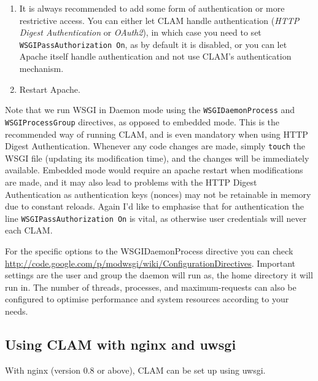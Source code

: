 \documentclass[a4paper,12pt,twoside,openright]{report}
\begin{document}
\begin{enumerate}[leftmargin=5mm]
\item It is always recommended to add some form of authentication or more restrictive
access. You can either let CLAM handle authentication (\emph{HTTP Digest
Authentication} or \emph{OAuth2}), in which case you need to set \texttt{WSGIPassAuthorization
On}, as by default it is disabled, or you can let Apache itself handle
authentication and not use CLAM's authentication mechanism.  
\item Restart Apache. 
\end{enumerate}

Note that we run WSGI in Daemon mode using the \texttt{WSGIDaemonProcess} and
\texttt{WSGIProcessGroup} directives, as opposed to embedded mode. This is the
recommended way of running CLAM, and is even mandatory when using HTTP Digest
Authentication. Whenever any code changes are made, simply
\texttt{touch} the WSGI file (updating its modification time), and the changes
will be immediately available. Embedded mode would require an apache restart
when modifications are made, and it may also lead to problems with the HTTP
Digest Authentication as authentication keys (nonces) may not be retainable in
memory due to constant reloads.  Again I'd like to emphasise that for
authentication the line \texttt{WSGIPassAuthorization On} is vital, as
otherwise user credentials will never each CLAM.

For the specific options to the WSGIDaemonProcess directive you can check
\url{http://code.google.com/p/modwsgi/wiki/ConfigurationDirectives}.
Important settings are the user and group the daemon will run as, the home
directory it will run in. The number of threads, processes, and
maximum-requests can also be configured to optimise performance and system
resources according to your needs.

\subsection{Using CLAM with nginx and uwsgi}

With nginx (version 0.8 or above), CLAM can be set up using uwsgi.
\end{document}
